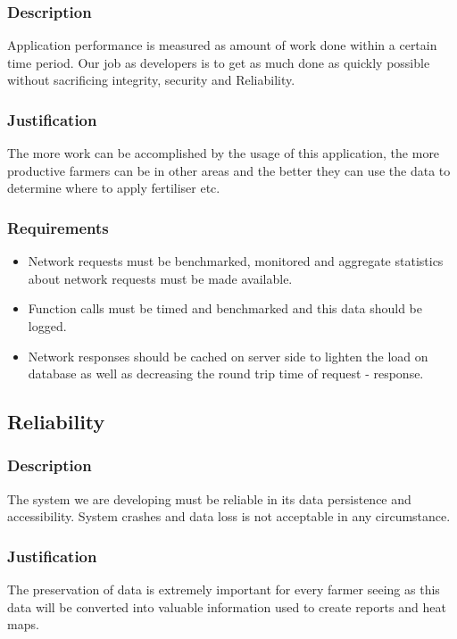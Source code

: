 \documentclass[11pt,fleqn]{book} %
\begin{document}
			\subsubsection{Description}
				Application performance is measured as amount of work done within a certain time period. Our job as developers is to get as much done as quickly possible without sacrificing integrity, security and Reliability.\newline
			\subsubsection{Justification}
				The more work can be accomplished by the usage of this application, the more productive farmers can be in other areas and the better they can use the data to determine where to apply fertiliser etc.\newline
			\subsubsection{Requirements}
				\begin{itemize}
					\item Network requests must be benchmarked, monitored and aggregate statistics about network requests must be made available.
					\item Function calls must be timed and benchmarked and this data should be logged.
					\item Network responses should be cached on server side to lighten the load on database as well as decreasing the round trip time of request - response.
				\end{itemize}
		\subsection{Reliability}
			\subsubsection{Description}
				The system we are developing must be reliable in its data persistence and accessibility. System crashes and data loss is not acceptable in any circumstance.
			\subsubsection{Justification}
				The preservation of data is extremely important for every farmer seeing as this data will be converted into valuable information used to create reports and heat maps.
\end{document}
